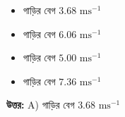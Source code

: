 \documentclass[12pt, a4paper]{article}
\begin{document}
\begin{itemize}[label={}, leftmargin=1cm, itemsep=0.5em]
\item[\textbf{A)}] গাড়ির বেগ $3.68\text{ ms}^{-1}$
\item[\textbf{B)}] গাড়ির বেগ $6.06\text{ ms}^{-1}$
\item[\textbf{C)}] গাড়ির বেগ $5.00\text{ ms}^{-1}$
\item[\textbf{D)}] গাড়ির বেগ $7.36\text{ ms}^{-1}$
\end{itemize}

\vspace{0.5em}
\begin{tcolorbox}[answerbox]
\textbf{\color{success} উত্তর:} A) গাড়ির বেগ $3.68\text{ ms}^{-1}$
\end{tcolorbox}
\vspace{1em}
\end{document}
